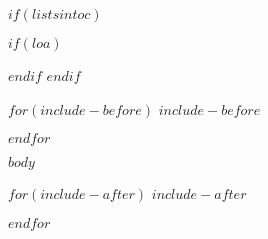 \documentclass[
$if(draft)$
  draft,
$endif$
$if(fontsize)$
  $fontsize$,
$endif$
$if(margins)$
  $margins$,
$endif$
$if(spacing)$
  $spacing$,
$endif$
$if(clearpagestyle)$
  $clearpagestyle$,
$endif$
$if(notespacing)$
  $notespacing$,
$endif$
$for(classoption)$
  $classoption$$sep$,
$endfor$
]{ut-thesis}
\newcommand\listofappendices{\listofatoc}
\begin{document}
\begin{preliminary}
\tableofcontents


$if(listsintoc)$
  \listoftables

  \listoffigures

  $if(loa)$
    \listofappendices
  $endif$
$endif$

\end{preliminary}


$for(include-before)$
$include-before$

$endfor$

$body$

$for(include-after)$
$include-after$

$endfor$
\end{document}
